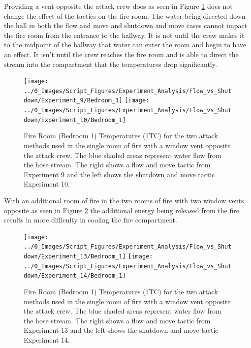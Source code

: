 \documentclass[12pt,oneside]{book}
\begin{document}
Providing a vent opposite the attack crew does as seen in Figure \ref{fig:Flow_vs_Shut_Single_Vent_Fire_Temp} does not change the effect of the tactics on the fire room. The water being directed down the hall in both the flow and move and shutdown and move cases cannot impact the fire room from the entrance to the hallway. It is not until the crew makes it to the midpoint of the hallway that water can enter the room and begin to have an effect. It isn't until the crew reaches the fire room and is able to direct the stream into the compartment that the temperatures drop significantly.  

\begin{figure}[H]
\centering
\texttt{[image: ../0\_Images/Script\_Figures/Experiment\_Analysis/Flow\_vs\_Shutdown/Experiment\_9/Bedroom\_1]}
\texttt{[image: ../0\_Images/Script\_Figures/Experiment\_Analysis/Flow\_vs\_Shutdown/Experiment\_10/Bedroom\_1]}
\caption[Single Room - Window Vent Opposite - Flow \& Move vs. Shutdown \& Move - Bedroom 1 Temperature]{Fire Room (Bedroom 1) Temperatures (1TC) for the two attack methods used in the single room of fire with a window vent opposite the attack crew. The blue shaded areas represent water flow from the hose stream. The right shows a flow and move tactic from Experiment 9 and the left shows the shutdown and move tactic Experiment 10.}
\label{fig:Flow_vs_Shut_Single_Vent_Fire_Temp}
\end{figure}

With an additional room of fire in the two rooms of fire with two window vents opposite as seen in Figure \ref{fig:Flow_vs_Shut_Two_Vent_Fire_Temp} the additional energy being released from the fire results in more difficulty in cooling the fire compartment.  

\begin{figure}[H]
\centering
\texttt{[image: ../0\_Images/Script\_Figures/Experiment\_Analysis/Flow\_vs\_Shutdown/Experiment\_13/Bedroom\_1]}
\texttt{[image: ../0\_Images/Script\_Figures/Experiment\_Analysis/Flow\_vs\_Shutdown/Experiment\_14/Bedroom\_1]}
\caption[Two Room - Two Vents Opposite - Flow \& Move vs. Shutdown \& Move - Bedroom 1 Temperature]{Fire Room (Bedroom 1) Temperatures (1TC) for the two attack methods used in the single room of fire with a window vent opposite the attack crew. The blue shaded areas represent water flow from the hose stream. The right shows a flow and move tactic from Experiment 13 and the left shows the shutdown and move tactic Experiment 14.}
\label{fig:Flow_vs_Shut_Two_Vent_Fire_Temp}
\end{figure}
\end{document}
